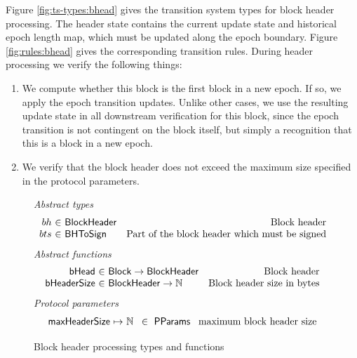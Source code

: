 \documentclass[11pt,a4paper]{article}
\newcommand{\fun}[1]{\mathsf{#1}}
\newcommand{\type}[1]{\mathsf{#1}}
\newcommand{\totalf}{\to}
\newcommand{\partialf}{\mapsto}
\newcommand{\Block}{\type{Block}}
\newcommand{\ProtParams}{\type{PParams}} %
\newcommand{\bhdrsizename}{bHeaderSize}
\begin{document}
Figure \ref{fig:ts-types:bhead} gives the transition system types for block
header processing. The header state contains the current update state and
historical epoch length map, which must be updated along the epoch boundary.
Figure \ref{fig:rules:bhead} gives the corresponding transition rules. During
header processing we verify the following things:

\begin{enumerate}
  \item We compute whether this block is the first block in a new epoch.
    If so, we apply the epoch transition updates. Unlike other cases, we use the
    resulting update state in all downstream verification for this block, since
    the epoch transition is not contingent on the block itself, but simply a
    recognition that this is a block in a new epoch.
  \item We verify that the block header does not exceed the maximum size
    specified in the protocol parameters.
\end{enumerate}

\begin{figure}[ht]
  \emph{Abstract types}
  \begin{equation*}
    \begin{array}{r@{~\in~}lr}
      bh & \Bhead & \text{Block header} \\
      bts & \Bhtosign & \text{Part of the block header which must be signed}
    \end{array}
  \end{equation*}
  \emph{Abstract functions}
  \begin{equation*}
    \begin{array}{r@{~\in~}lr}
      \fun{\bheadname} & \Block \totalf \Bhead & \text{Block header} \\
      \fun{\bhdrsizename} & \Bhead \totalf \mathbb{N} & \text{Block header size in bytes}\\
    \end{array}
  \end{equation*}
  \emph{Protocol parameters}
  \begin{equation*}
    \begin{array}{r@{~\partialf~}l!{~\in~\ProtParams~}r}
      \maxheadersize & \mathbb{N} & \text{maximum block header size} \\
    \end{array}
  \end{equation*}
  \caption{Block header processing types and functions}
  \label{fig:defs:bhead}
\end{figure}
\end{document}
